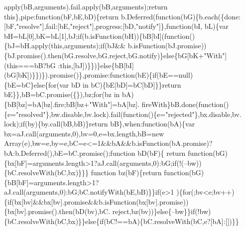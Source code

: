 \begin{DoxyCode}
      apply(bB,arguments).fail.apply(bB,arguments);\textcolor{keywordflow}{return} \textcolor{keyword}{this}\},pipe:\textcolor{keyword}{function}(bF,bE,bD)\{\textcolor{keywordflow}{return} 
      b.Deferred(\textcolor{keyword}{function}(bG)\{b.each(\{done:[bF,\textcolor{stringliteral}{"resolve"}],fail:[bE,\textcolor{stringliteral}{"reject"}],progress:[bD,\textcolor{stringliteral}{"notify"}]\},\textcolor{keyword}{function}(bI,
      bL)\{var bH=bL[0],bK=bL[1],bJ;\textcolor{keywordflow}{if}(b.isFunction(bH))\{bB[bI](\textcolor{keyword}{function}()\{bJ=bH.apply(\textcolor{keyword}{this},arguments);\textcolor{keywordflow}{if}(bJ&&
      b.isFunction(bJ.promise))\{bJ.promise().then(bG.resolve,bG.reject,bG.notify)\}\textcolor{keywordflow}{else}\{bG[bK+\textcolor{stringliteral}{"With"}](\textcolor{keyword}{this}===bB?bG
      :\textcolor{keyword}{this},[bJ])\}\})\}\textcolor{keywordflow}{else}\{bB[bI](bG[bK])\}\})\}).promise()\},promise:\textcolor{keyword}{function}(bE)\{\textcolor{keywordflow}{if}(bE==null)\{bE=bC\}\textcolor{keywordflow}{else}\{\textcolor{keywordflow}{for}(var bD 
      in bC)\{bE[bD]=bC[bD]\}\}\textcolor{keywordflow}{return} bE\}\},bB=bC.promise(\{\}),bz;\textcolor{keywordflow}{for}(bz in bA)\{bB[bz]=bA[bz].fire;bB[bz+\textcolor{stringliteral}{"With"}]=bA[bz].
      fireWith\}bB.done(\textcolor{keyword}{function}()\{e=\textcolor{stringliteral}{"resolved"}\},bw.disable,bv.lock).fail(\textcolor{keyword}{function}()\{e=\textcolor{stringliteral}{"rejected"}\},bx.disable,bv.
      lock);\textcolor{keywordflow}{if}(by)\{by.call(bB,bB)\}\textcolor{keywordflow}{return} bB\},when:\textcolor{keyword}{function}(bA)\{var bx=aJ.call(arguments,0),bv=0,e=bx.length,bB=\textcolor{keyword}{new} 
      Array(e),bw=e,by=e,bC=e<=1&&bA&&b.isFunction(bA.promise)?bA:b.Deferred(),bE=bC.promise();\textcolor{keyword}{function} bD(bF)\{\textcolor{keywordflow}{
      return} \textcolor{keyword}{function}(bG)\{bx[bF]=arguments.length>1?aJ.call(arguments,0):bG;\textcolor{keywordflow}{if}(!(--bw))\{bC.resolveWith(bC,bx)\}\}\}\textcolor{keyword}{
      function} bz(bF)\{\textcolor{keywordflow}{return} \textcolor{keyword}{function}(bG)\{bB[bF]=arguments.length>1?aJ.call(arguments,0):bG;bC.notifyWith(bE,bB)\}\}\textcolor{keywordflow}{if}(e>1
      )\{\textcolor{keywordflow}{for}(;bv<e;bv++)\{\textcolor{keywordflow}{if}(bx[bv]&&bx[bv].promise&&b.isFunction(bx[bv].promise))\{bx[bv].promise().then(bD(bv),bC.
      reject,bz(bv))\}\textcolor{keywordflow}{else}\{--bw\}\}\textcolor{keywordflow}{if}(!bw)\{bC.resolveWith(bC,bx)\}\}\textcolor{keywordflow}{else}\{\textcolor{keywordflow}{if}(bC!==bA)\{bC.resolveWith(bC,e?[bA]:[])\}\}\textcolor{keywordflow}{
}
\end{DoxyCode}
